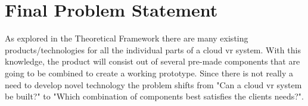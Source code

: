 \section{Final Problem Statement}

As explored in the Theoretical Framework there are many existing products/technologies for all the individual parts of a cloud \acrshort{vr} system. With this knowledge, the product will consist out of several pre-made components that are going to be combined to create a working prototype. Since there is not really a need to develop novel technology the problem shifts from "Can a cloud vr system be built?" to "Which combination of components best satisfies the clients needs?". 